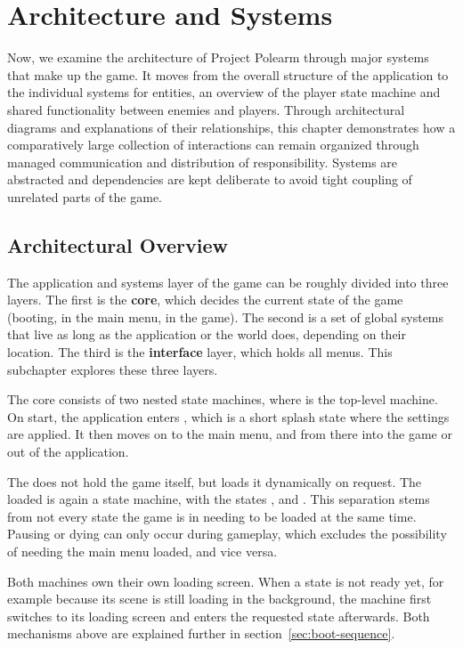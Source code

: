 \documentclass[../Main.tex]{subfiles}
\begin{document}
\section{Architecture and Systems}\label{sec:architecture-and-systems}

Now, we examine the architecture of Project Polearm through major systems that make up the game. It moves from the overall structure of the application to the individual systems for entities, an overview of the player state machine and shared functionality between enemies and players. Through architectural diagrams and explanations of their relationships, this chapter demonstrates how a comparatively large collection of interactions can remain organized through managed communication and distribution of responsibility. Systems are abstracted and dependencies are kept deliberate to avoid tight coupling of unrelated parts of the game.

\subsection{Architectural Overview}\label{sec:architectural-overview}

The application and systems layer of the game can be roughly divided into three layers. The first is the \textbf{core}, which decides the current state of the game (booting, in the main menu, in the game). The second is a set of global systems that live as long as the application or the world does, depending on their location. The third is the \textbf{interface} layer, which holds all menus. This subchapter explores these three layers.

The core consists of two nested state machines, where  is the top-level machine. On start, the application enters , which is a short splash state where the settings are applied. It then moves on to the main menu, and from there into the game or out of the application.

The  does not hold the game itself, but loads it dynamically on request. The loaded  is again a state machine, with the states ,  and . This separation stems from not every state the game is in needing to be loaded at the same time. Pausing or dying can only occur during gameplay, which excludes the possibility of needing the main menu loaded, and vice versa.

Both machines own their own loading screen. When a state is not ready yet, for example because its scene is still loading in the background, the machine first switches to its loading screen and enters the requested state afterwards. Both mechanisms above are explained further in section~\ref{sec:boot-sequence}.
\end{document}
